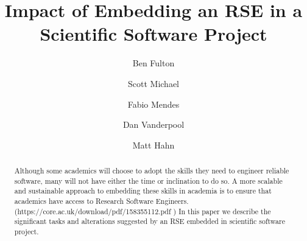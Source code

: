 \documentclass[acmtog, authorversion]{acmart}
\begin{document}
\title{Impact of Embedding an RSE in a Scientific Software Project}

\author{Ben Fulton}
\author{Scott Michael}
\authornotemark[1]

\author{Fabio Mendes}


\author{Dan Vanderpool}

\author{Matt Hahn}

\renewcommand{\shortauthors}{Fulton and Michael, et al.}

\newif\ifdraft
\drafttrue
\ifdraft
\newcommand{\note}[1]{ {\textcolor{blue} { ***NOTE: #1 }}}
\newcommand{\scott}[1]{ {\textcolor{red} { ***Scott: #1 }}}
\newcommand{\ben}[1]{ {\textcolor{green} {***Ben: #1}}}
\else
\newcommand{\note}[1]{ {}}
\newcommand{\scott}[1]{ {}}
\newcommand{\ben}[1]{ {}}
\fi

\begin{abstract}
 Although some academics will choose to adopt the skills they need to engineer reliable software, many will not have either the time or inclination to do so. A more scalable and sustainable approach to embedding these skills in academia is to ensure that academics have access to Research Software Engineers. (https://core.ac.uk/download/pdf/158355112.pdf ) In this paper we describe the significant tasks and alterations suggested by an RSE embedded in scientific software project.
\end{abstract}
\end{document}
